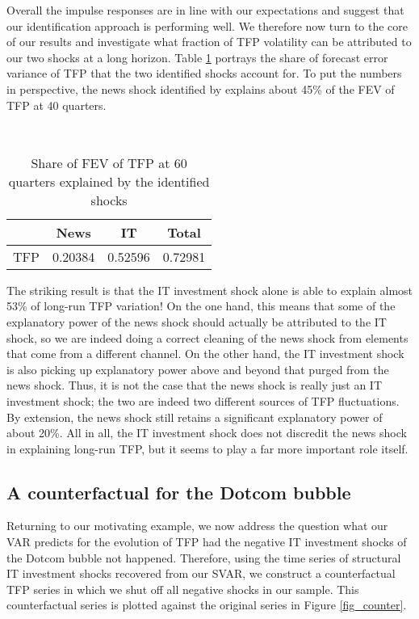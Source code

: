 \documentclass[11pt]{article}
\renewcommand{\[}{\begin{equation}}
\renewcommand{\]}{\end{equation}}
\begin{document}
Overall the impulse responses are in line with our expectations and suggest that our identification approach is performing well. We therefore now turn to the core of our results and investigate what fraction of TFP volatility can be attributed to our two shocks at a long horizon. Table \ref{tab_vardecomp} portrays the share of forecast error variance of TFP that the two identified shocks account for. To put the numbers in perspective, the news shock identified by \cite{barsky_sims2011} explains about 45\% of the FEV of TFP at 40 quarters.   


\begin{table}[h!]
\centering
\caption{Share of FEV of TFP at 60 quarters explained by the identified shocks}
\label{tab_vardecomp}
\

\begin{large}
	\begin{tabular}{lccc}
	\hline
		& News & IT & Total \\
		\hline
	TFP	           & 0.20384  & 0.52596 & 0.72981  \\
		\hline
	\end{tabular}
\end{large}
\end{table}

The striking result is that the IT investment shock alone is able to explain almost 53\% of long-run TFP variation!  On the one hand, this means that some of the explanatory power of the news shock should actually be attributed to the IT shock, so we are indeed doing a correct cleaning of the news shock from elements that come from a different channel. On the other hand, the IT investment shock is also picking up explanatory power above and beyond that purged from the news shock. Thus, it is not the case that the news shock is really just an IT investment shock; the two are indeed two different sources of TFP fluctuations. By extension, the news shock still retains a significant explanatory power of about 20\%. All in all, the IT investment shock does not discredit the news shock in explaining long-run TFP, but it seems to play a far more important role itself.

\subsection{A counterfactual for the Dotcom bubble}
Returning to our motivating example, we now address the question what our VAR predicts for the evolution of TFP had the negative IT investment shocks of the Dotcom bubble not happened. Therefore, using the time series of structural IT investment shocks recovered from our SVAR, we construct a counterfactual TFP series in which we shut off all negative shocks in our sample. This counterfactual series is plotted against the original series in Figure \ref{fig_counter}.
\end{document}

